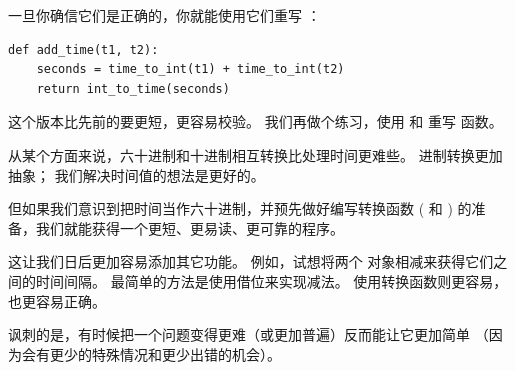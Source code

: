 {一旦你确信它们是正确的，你就能使用它们重写  ：

\begin{lstlisting}
def add_time(t1, t2):
    seconds = time_to_int(t1) + time_to_int(t2)
    return int_to_time(seconds)
\end{lstlisting}

%

这个版本比先前的要更短，更容易校验。
我们再做个练习，使用  和 
重写  函数。


从某个方面来说，六十进制和十进制相互转换比处理时间更难些。 进制转换更加抽象；
我们解决时间值的想法是更好的。


但如果我们意识到把时间当作六十进制，并预先做好编写转换函数 ( 
和 ) 的准备，我们就能获得一个更短、更易读、更可靠的程序。


这让我们日后更加容易添加其它功能。 例如，试想将两个 
对象相减来获得它们之间的时间间隔。
最简单的方法是使用借位来实现减法。 使用转换函数则更容易，也更容易正确。

  


讽刺的是，有时候把一个问题变得更难（或更加普遍）反而能让它更加简单
（因为会有更少的特殊情况和更少出错的机会）。

}
